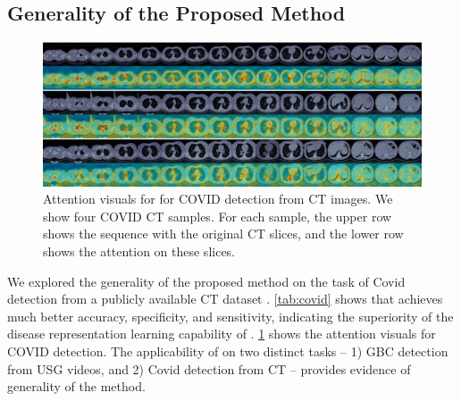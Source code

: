 \subsection{Generality of the Proposed Method}
%


\begin{figure}[!t]
    \centering
    \includegraphics[width=\linewidth]{figs/vis_attn_covid.png}
    \caption[Attention visuals for \focusmae for Covid detection]{Attention visuals for \focusmae for COVID detection from CT images. We show four COVID CT samples. For each  sample, the upper row shows the sequence with the original CT slices, and the lower row shows the attention on these slices.}
    \label{focusmae_fig:visual_supp_covid}
\end{figure}

%
We explored the generality of the proposed \focusmae method on the task of Covid detection from a publicly available CT dataset \cite{covidctmd}. \cref{tab:covid} shows that \focusmae achieves much better accuracy, specificity, and sensitivity, indicating the superiority of the disease representation learning capability of \focusmae. \cref{focusmae_fig:visual_supp_covid} shows the attention visuals for COVID detection. The applicability of \focusmae on two distinct tasks -- 1) GBC detection from USG videos, and 2) Covid detection from CT -- provides evidence of generality of the method. 


